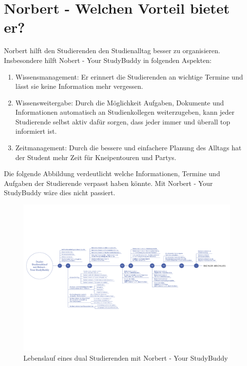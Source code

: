 \section{Norbert - Welchen Vorteil bietet er?}
Norbert hilft den Studierenden den Studienalltag besser zu organisieren. Insbesondere hilft Nobert - Your StudyBuddy in folgenden Aspekten:
\begin{enumerate}
	\item Wissensmanagement: Er erinnert die Studierenden an wichtige Termine und lässt sie keine Information mehr vergessen.
	\item Wissensweitergabe: Durch die Möglichkeit Aufgaben, Dokumente und Informationen automatisch an Studienkollegen weiterzugeben, kann jeder Studierende selbst aktiv dafür sorgen, dass jeder immer und überall top informiert ist.
	\item Zeitmanagement: Durch die bessere und einfachere Planung des Alltags hat der Student mehr Zeit für Kneipentouren und Partys.	
\end{enumerate}

Die folgende Abbildung verdeutlicht welche Informationen, Termine und Aufgaben der Studierende verpasst haben könnte. Mit Norbert - Your StudyBuddy wäre dies nicht passiert.

\newpage
\begin{landscape}
\vspace*{35mm}
	\begin{figure}[H]
	\centering
	\includegraphics[scale=0.75]{images/timeline.pdf}
	\caption{Lebenslauf eines dual Studierenden mit Norbert - Your StudyBuddy}
	\end{figure}
	
\end{landscape}
\newpage

